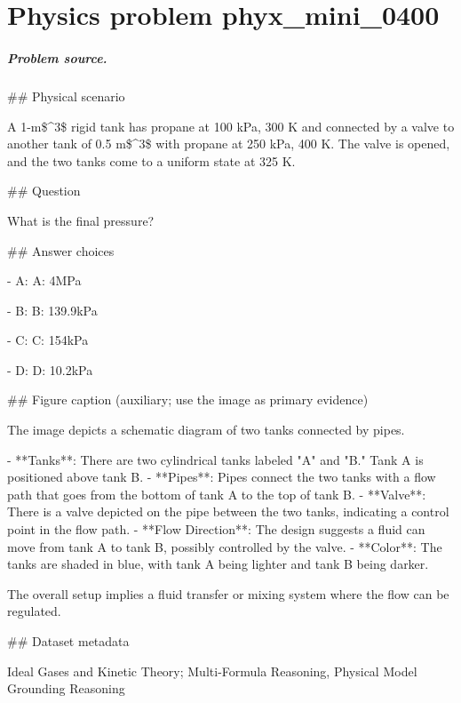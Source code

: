 
\chapter{Physics problem phyx\_mini\_0400}
\label{ch:PhyXMiniProblems_problem_phyx_mini_0400}

\paragraph{Problem source.}
\#\# Physical scenario

A 1-m\$\textasciicircum{}3\$ rigid tank has propane at 100 kPa, 300 K and connected by a valve to another tank of 0.5 m\$\textasciicircum{}3\$ with propane at 250 kPa, 400 K. The valve is opened, and the two tanks come to a uniform state at 325 K.

\#\# Question

What is the final pressure?

\#\# Answer choices

- A: A: 4MPa

- B: B: 139.9kPa

- C: C: 154kPa

- D: D: 10.2kPa

\#\# Figure caption (auxiliary; use the image as primary evidence)

The image depicts a schematic diagram of two tanks connected by pipes. 

- **Tanks**: There are two cylindrical tanks labeled "A" and "B." Tank A is positioned above tank B.
- **Pipes**: Pipes connect the two tanks with a flow path that goes from the bottom of tank A to the top of tank B.
- **Valve**: There is a valve depicted on the pipe between the two tanks, indicating a control point in the flow path.
- **Flow Direction**: The design suggests a fluid can move from tank A to tank B, possibly controlled by the valve. 
- **Color**: The tanks are shaded in blue, with tank A being lighter and tank B being darker.

The overall setup implies a fluid transfer or mixing system where the flow can be regulated.

\#\# Dataset metadata

Ideal Gases and Kinetic Theory; Multi-Formula Reasoning, Physical Model Grounding Reasoning

